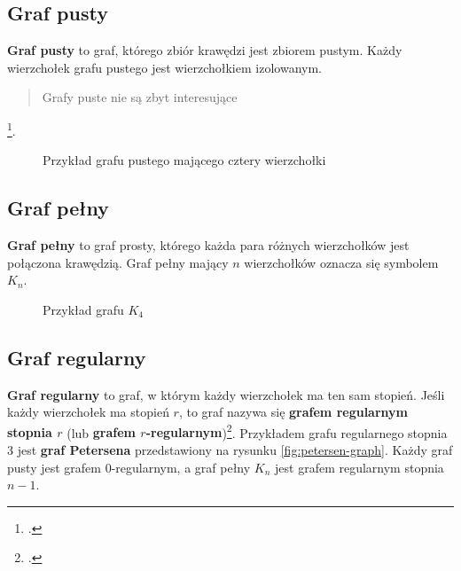 \subsection*{Graf pusty}

\textbf{Graf pusty} to graf, którego zbiór krawędzi jest zbiorem pustym. Każdy wierzchołek grafu pustego jest wierzchołkiem izolowanym. \blockquote{Grafy puste nie są zbyt interesujące}\footcite[30]{wilson}.

\begin{figure}[h]
\centering
{}
\captionsetup{justification=centering}
\caption{Przykład grafu pustego mającego cztery wierzchołki} \label{fig:empty-graph-example}
\end{figure}

\subsection*{Graf pełny}

\textbf{Graf pełny} to graf prosty, którego każda para różnych wierzchołków jest połączona krawędzią. Graf pełny mający $n$ wierzchołków oznacza się symbolem $K_n$. 

\begin{figure}[h]
\centering
{}
\captionsetup{justification=centering}
\caption{Przykład grafu $K_4$} \label{fig:complete-graph-example}
\end{figure}

\subsection*{Graf regularny}

\textbf{Graf regularny} to graf, w którym każdy wierzchołek ma ten sam stopień. Jeśli każdy wierzchołek ma stopień $r$, to graf nazywa się \textbf{grafem regularnym stopnia $r$} (lub \textbf{grafem $r$-regularnym})\footcite[31]{wilson}. Przykładem grafu regularnego stopnia 3 jest \textbf{graf Petersena} przedstawiony na rysunku \ref{fig:petersen-graph}. Każdy graf pusty jest grafem $0$-regularnym, a graf pełny $K_n$ jest grafem regularnym stopnia $n-1$. 

